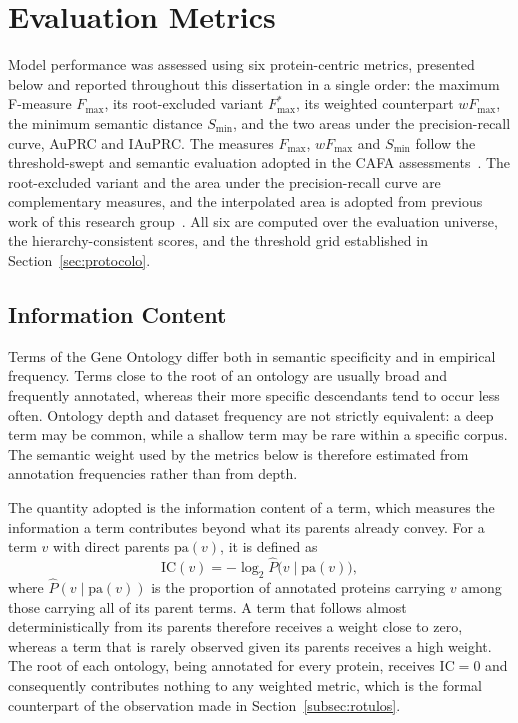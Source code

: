 \documentclass[Ingles]{ic-tese-v3}
\begin{document}
\section{Evaluation Metrics}
\label{sec:metricas}

Model performance was assessed using six protein-centric metrics, presented below
and reported throughout this dissertation in a single order: the maximum
F-measure $F_{\max}$, its root-excluded variant $F_{\max}^{*}$, its weighted
counterpart $wF_{\max}$, the minimum semantic distance $S_{\min}$, and the two
areas under the precision-recall curve, AuPRC and IAuPRC. The measures
$F_{\max}$, $wF_{\max}$ and $S_{\min}$ follow the threshold-swept and semantic
evaluation adopted in the CAFA assessments~\cite{radivojac2013large,
zhou_cafa_2019}. The root-excluded variant and the area under the
precision-recall curve are complementary measures, and the interpolated area is
adopted from previous work of this research group~\cite{oliveira2025supermagov2}.
All six are computed over the evaluation universe, the hierarchy-consistent
scores, and the threshold grid established in Section~\ref{sec:protocolo}.

\subsection{Information Content}
\label{subsec:ic}

Terms of the Gene Ontology differ both in semantic specificity and in empirical
frequency. Terms close to the root of an ontology are usually broad and
frequently annotated, whereas their more specific descendants tend to occur less
often. Ontology depth and dataset frequency are not strictly equivalent: a deep
term may be common, while a shallow term may be rare within a specific corpus.
The semantic weight used by the metrics below is therefore estimated from
annotation frequencies rather than from depth.

The quantity adopted is the information content of a term, which measures the
information a term contributes beyond what its parents already convey. For
a term $v$ with direct parents $\mathrm{pa}(v)$, it is defined as
\begin{equation}
\label{eq:ic}
\mathrm{IC}(v) = -\log_{2} \widehat{P}\bigl(v \mid \mathrm{pa}(v)\bigr),
\end{equation}
\noindent where $\widehat{P}(v \mid \mathrm{pa}(v))$ is the proportion of annotated
proteins carrying $v$ among those carrying all of its parent terms. A term that
follows almost deterministically from its parents therefore receives a weight
close to zero, whereas a term that is rarely observed given its parents receives
a high weight. The root of each ontology, being annotated for every protein,
receives $\mathrm{IC} = 0$ and consequently contributes nothing to any weighted
metric, which is the formal counterpart of the observation made in
Section~\ref{subsec:rotulos}.
\end{document}
